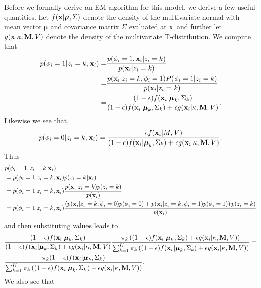 \documentclass[12pt,english]{article}\usepackage[]{graphicx}\usepackage[]{color}
\begin{document}
Before we formally derive an EM algorithm for this model, we derive a few useful quantities. Let $f({\bf x} | \boldsymbol{\mu}, \Sigma)$ denote the density of the multivariate normal with mean vector $\boldsymbol{\mu}$ and covariance matrix $\Sigma$ evaluated at ${\bf x}$ and further let $g({\bf x} | \kappa, {\bf M}, V )$ denote the density of the multivariate T-distribution. We compute that
\begin{equation}
\begin{split}
p(\phi_i = 1|z_i = k , {\bf x}_i ) = &\frac{p(\phi_i=1, {\bf x}_i|z_i = k)}{p({\bf x}_i|z_i = k)}\\
=  & \frac{p({\bf x}_i|z_i = k, \phi_i =1)P(\phi_i=1|z_i= k)}{p({\bf x}_i|z_i = k)}\\
=  &\frac{(1-\epsilon)f({\bf x}_i|\boldsymbol{\mu}_k, \Sigma_{k})}{(1-\epsilon) f({\bf x}_i|\boldsymbol{\mu}_k, \Sigma_k) + \epsilon g({\bf x}_i|\kappa, {\bf M}, V)}.
\end{split}
\end{equation}
Likewise we see that,
\begin{equation}
\begin{split}
p(\phi_i = 0|z_i = k , {\bf x}_i ) = \frac{\epsilon f({\bf x}_i|M, V)}{(1-\epsilon) f({\bf x}_i|\boldsymbol{\mu}_k, \Sigma_k) + \epsilon g({\bf x}_i|\kappa, {\bf M}, V)}.
\end{split}
\end{equation}
Thus
\begin{equation}
\begin{split}
& p(\phi_i = 1, z_i = k| {\bf x}_i ) \\
& = p(\phi_i = 1|z_i = k, {\bf x}_i)p(z_i = k|{\bf x}_i)\\
& = p(\phi_i = 1|z_i = k, {\bf x}_i)\frac{p({\bf x}_i|z_i = k)p(z_i = k)}{p({\bf x}_i)}\\
& = p(\phi_i = 1|z_i = k, {\bf x}_i)\frac{\left(p({\bf x}_i|z_i = k,\phi_i =0)p(\phi_i=0) + p({\bf x}_i|z_i = k,\phi_i =1)p(\phi_i=1) \right)p(z_i = k)}{p({\bf x}_i)}\\
\end{split}
\end{equation}
and then substituting values leads to
\begin{equation}
\begin{split}
& \frac{(1-\epsilon)f({\bf x}_i|\boldsymbol{\mu}_k, \Sigma_{k})}{ (1-\epsilon) f({\bf x}_i|\boldsymbol{\mu}_k, \Sigma_k) + \epsilon g({\bf x}_i|\kappa, {\bf M}, V)}\frac{\pi_k \left((1-\epsilon)f({\bf x}_i|\boldsymbol{\mu}_k, \Sigma_{k}) + \epsilon g({\bf x}_i|\kappa, {\bf M}, V)\right)}{\sum_{k=1}^{K}\pi_k\left((1-\epsilon) f({\bf x}_i|\boldsymbol{\mu}_k, \Sigma_k) + \epsilon g({\bf x}_i|\kappa, {\bf M}, V)\right)} = \\
& \frac{\pi_k(1-\epsilon)f({\bf x}_i|\boldsymbol{\mu}_k, \Sigma_{k})}{\sum_{k=1}^{K}\pi_k\left((1-\epsilon) f({\bf x}_i|\boldsymbol{\mu}_k, \Sigma_k) + \epsilon g({\bf x}_i|\kappa, {\bf M}, V)\right)}.\\
\end{split}
\end{equation}
We also see that
\end{document}
